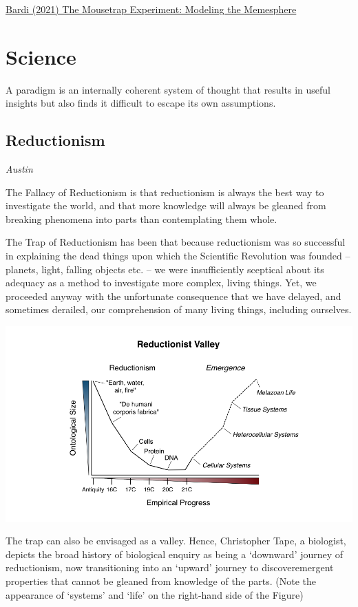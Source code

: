 \documentclass[
]{book}
\begin{document}
\href{https://thesenecaeffect.blogspot.com/2021/11/the-mousetrap-experiment-modeling.html}{Bardi (2021) The Mousetrap Experiment: Modeling the Memesphere}

\hypertarget{science}{%
\chapter{Science}\label{science}}

A paradigm is an internally coherent system of thought that results in useful insights but also finds it difficult to escape its own assumptions.

\hypertarget{reductionism}{%
\section{Reductionism}\label{reductionism}}

\emph{Austin}

The Fallacy of Reductionism is that reductionism is always the best way to investigate the world, and that more knowledge will always be gleaned from breaking phenomena into parts than contemplating them whole.

The Trap of Reductionism has been that because reductionism was so successful in explaining the dead things upon which the Scientific Revolution was founded -- planets, light, falling objects etc. -- we were insufficiently sceptical about its adequacy as a method to investigate more complex, living things. Yet, we proceeded anyway with the unfortunate consequence that we have delayed, and sometimes derailed, our comprehension of many living things, including ourselves.

\includegraphics{fig/reductionist_avlley.png}

The trap can also be envisaged as a valley. Hence, Christopher Tape, a biologist, depicts the broad history of biological enquiry as being a `downward' journey of reductionism, now transitioning into an `upward' journey to discoveremergent properties that cannot be gleaned from knowledge of the parts.
(Note the appearance of `systems' and `life' on the right-hand side of the Figure)
\end{document}
